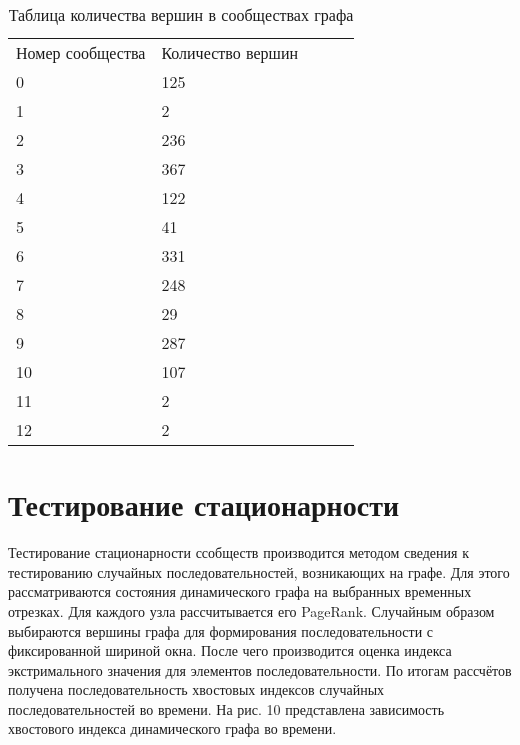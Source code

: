 \documentclass[reprint, amsmath, amssymb, aps,]{revtex4-2}
\begin{document}
\begin{table}[h!]
\begin{tabular}{|l|l|lll}
\cline{1-2}
Номер сообщества & Количество вершин &  &  &  \\ \cline{1-2}
0                & 125               &  &  &  \\ \cline{1-2}
1                & 2                 &  &  &  \\ \cline{1-2}
2                & 236               &  &  &  \\ \cline{1-2}
3                & 367               &  &  &  \\ \cline{1-2}
4                & 122               &  &  &  \\ \cline{1-2}
5                & 41                &  &  &  \\ \cline{1-2}
6                & 331               &  &  &  \\ \cline{1-2}
7                & 248               &  &  &  \\ \cline{1-2}
8                & 29                &  &  &  \\ \cline{1-2}
9                & 287               &  &  &  \\ \cline{1-2}
10               & 107               &  &  &  \\ \cline{1-2}
11               & 2                 &  &  &  \\ \cline{1-2}
12               & 2                 &  &  &  \\ \cline{1-2}

\end{tabular}
\caption {Таблица количества вершин в сообществах графа}
\end{table}




\section{Тестирование стационарности}

Тестирование стационарности ссобществ производится методом сведения к тестированию случайных последовательностей, возникающих на графе. Для этого рассматриваются состояния динамического графа на выбранных временных отрезках. Для каждого узла рассчитывается его PageRank. Случайным образом выбираются вершины графа для формирования последовательности с фиксированной шириной окна. После чего производится оценка индекса экстримального значения для элементов последовательности. По итогам рассчётов получена последовательность хвостовых индексов случайных последовательностей во времени. 
На рис. 10 представлена зависимость хвостового индекса динамического графа во времени.
\end{document}
